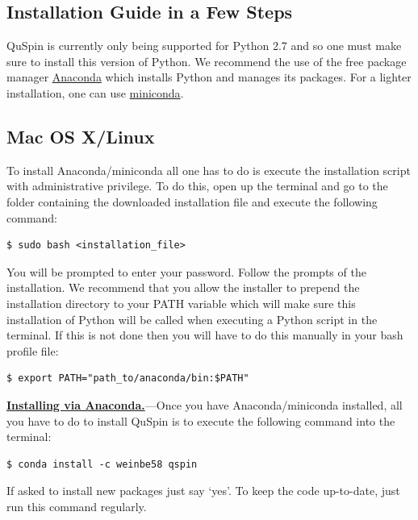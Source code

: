 \documentclass{SciPost}
\newcommand\0{\scalebox{-1}[1]{0}}
\let\svttfamily\ttfamily
\renewcommand\ttfamily{\svttfamily\catcode`0=\active }
\begin{document}
\begin{appendix}

\section{Installation Guide in a Few Steps}
\label{app:install}

QuSpin is currently only being supported for Python 2.7 and so one must make sure to install this version of Python. We recommend the use of the free package manager \href{https://www.continuum.io/downloads}{Anaconda} which installs Python and manages its packages. For a lighter installation, one can use \href{http://conda.pydata.org/miniconda.html}{miniconda}.

\subsection{Mac OS X/Linux}
To install Anaconda/miniconda all one has to do is execute the installation script with administrative privilege. To do this, open up the terminal and go to the folder containing the downloaded installation file and execute the following command: 
\begin{lstlisting}[numbers=none,keywordstyle=\ttfamily]
$ sudo bash <installation_file>
\end{lstlisting}
You will be prompted to enter your password. Follow the prompts of the installation. We recommend that you allow the installer to prepend the installation directory to your PATH variable which will make sure this installation of Python will be called when executing a Python script in the terminal. If this is not done then you will have to do this manually in your bash profile file:
\begin{lstlisting}[numbers=none,keywordstyle=\ttfamily]
$ export PATH="path_to/anaconda/bin:$PATH"
\end{lstlisting}

\underline{\bf Installing via Anaconda.}---Once you have Anaconda/miniconda installed, all you have to do to install QuSpin is to execute the following command into the terminal: 
\begin{lstlisting}[numbers=none,keywordstyle=\ttfamily]
$ conda install -c weinbe58 qspin
\end{lstlisting}
If asked to install new packages just say `yes'. To keep the code up-to-date, just run this command regularly. 


\end{appendix}
\end{document}

